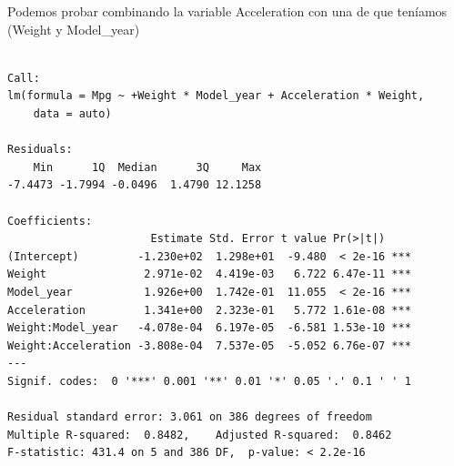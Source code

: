 \documentclass[
]{article}
\newenvironment{Shaded}{\begin{snugshade}}{\end{snugshade}}
\newcommand{\DataTypeTok}[1]{\textcolor[rgb]{0.13,0.29,0.53}{#1}}
\newcommand{\KeywordTok}[1]{\textcolor[rgb]{0.13,0.29,0.53}{\textbf{#1}}}
\newcommand{\NormalTok}[1]{#1}
\newcommand{\OperatorTok}[1]{\textcolor[rgb]{0.81,0.36,0.00}{\textbf{#1}}}
\newcommand{\StringTok}[1]{\textcolor[rgb]{0.31,0.60,0.02}{#1}}
\begin{document}
Podemos probar combinando la variable Acceleration con una de que
teníamos (Weight y Model\_year)

\begin{Shaded}
\end{Shaded}

\begin{verbatim}

Call:
lm(formula = Mpg ~ +Weight * Model_year + Acceleration * Weight, 
    data = auto)

Residuals:
    Min      1Q  Median      3Q     Max 
-7.4473 -1.7994 -0.0496  1.4790 12.1258 

Coefficients:
                      Estimate Std. Error t value Pr(>|t|)    
(Intercept)         -1.230e+02  1.298e+01  -9.480  < 2e-16 ***
Weight               2.971e-02  4.419e-03   6.722 6.47e-11 ***
Model_year           1.926e+00  1.742e-01  11.055  < 2e-16 ***
Acceleration         1.341e+00  2.323e-01   5.772 1.61e-08 ***
Weight:Model_year   -4.078e-04  6.197e-05  -6.581 1.53e-10 ***
Weight:Acceleration -3.808e-04  7.537e-05  -5.052 6.76e-07 ***
---
Signif. codes:  0 '***' 0.001 '**' 0.01 '*' 0.05 '.' 0.1 ' ' 1

Residual standard error: 3.061 on 386 degrees of freedom
Multiple R-squared:  0.8482,    Adjusted R-squared:  0.8462 
F-statistic: 431.4 on 5 and 386 DF,  p-value: < 2.2e-16
\end{verbatim}

\begin{Shaded}
\end{Shaded}
\end{document}
